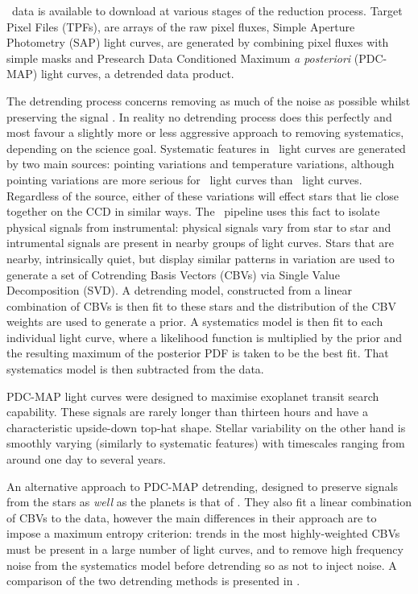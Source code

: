 \kepler\ data is available to download at various stages of the reduction
process.
Target Pixel Files (TPFs), are arrays of the raw pixel fluxes, Simple Aperture
Photometry (SAP) light curves, are generated by combining pixel fluxes with
simple masks and Presearch Data Conditioned Maximum {\it a posteriori}
(PDC-MAP) light curves, a detrended data product.

The detrending process concerns removing as much of the noise as possible
whilst preserving the signal \citep{Smith2012, Stumpe2012}.
In reality no detrending process does this perfectly and most favour a
slightly more or less aggressive approach to removing systematics, depending
on the science goal.
Systematic features in \kepler\ light curves are generated by two main
sources: pointing variations and temperature variations, although pointing
variations are more serious for \ktwo\ light curves than \kepler\ light
curves.
Regardless of the source, either of these variations will effect stars that
lie close together on the CCD in similar ways.
The \kepler\ pipeline uses this fact to isolate physical signals from
instrumental: physical signals vary from star to star and intrumental signals
are present in nearby groups of light curves.
Stars that are nearby, intrinsically quiet, but display similar patterns in
variation are used to generate a set of Cotrending Basis Vectors (CBVs) via
Single Value Decomposition (SVD).
A detrending model, constructed from a linear combination of CBVs is then fit
to these stars and the distribution of the CBV weights are used to generate a
prior.
A systematics model is then fit to each individual light curve, where a
likelihood function is multiplied by the prior and the resulting maximum of
the posterior PDF is taken to be the best fit.
That systematics model is then subtracted from the data.

PDC-MAP light curves were designed to maximise exoplanet transit search
capability.
These signals are rarely longer than thirteen hours and have a characteristic
upside-down top-hat shape.
Stellar variability on the other hand is smoothly varying (similarly to
systematic features) with timescales ranging from around one day to several
years.

An alternative approach to PDC-MAP detrending, designed to preserve signals
from the stars as {\it well} as the planets is that of \citet{Roberts2013}.
They also fit a linear combination of CBVs to the data, however the main
differences in their approach are to impose a maximum entropy criterion:
trends in the most highly-weighted CBVs must be present in a large number of
light curves, and to remove high frequency noise from the systematics model
before detrending so as not to inject noise.
A comparison of the two detrending methods is presented in
\citet{Roberts2013}.


